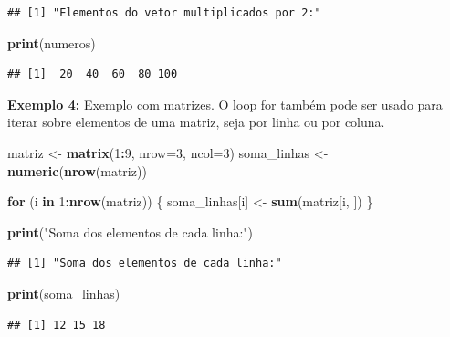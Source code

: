 \documentclass[
]{book}
\newenvironment{Shaded}{\begin{snugshade}}{\end{snugshade}}
\newcommand{\AttributeTok}[1]{\textcolor[rgb]{0.13,0.29,0.53}{#1}}
\newcommand{\ControlFlowTok}[1]{\textcolor[rgb]{0.13,0.29,0.53}{\textbf{#1}}}
\newcommand{\DecValTok}[1]{\textcolor[rgb]{0.00,0.00,0.81}{#1}}
\newcommand{\FunctionTok}[1]{\textcolor[rgb]{0.13,0.29,0.53}{\textbf{#1}}}
\newcommand{\NormalTok}[1]{#1}
\newcommand{\OtherTok}[1]{\textcolor[rgb]{0.56,0.35,0.01}{#1}}
\newcommand{\SpecialCharTok}[1]{\textcolor[rgb]{0.81,0.36,0.00}{\textbf{#1}}}
\newcommand{\StringTok}[1]{\textcolor[rgb]{0.31,0.60,0.02}{#1}}
\theoremstyle{definition}
\theoremstyle{definition}
\theoremstyle{definition}
\theoremstyle{definition}
\theoremstyle{remark}
\begin{document}
\begin{verbatim}
## [1] "Elementos do vetor multiplicados por 2:"
\end{verbatim}

\begin{Shaded}
\begin{Highlighting}[]
\FunctionTok{print}\NormalTok{(numeros)}
\end{Highlighting}
\end{Shaded}

\begin{verbatim}
## [1]  20  40  60  80 100
\end{verbatim}

\textbf{Exemplo 4:} Exemplo com matrizes. O loop for também pode ser usado para iterar sobre elementos de uma matriz, seja por linha ou por coluna.

\begin{Shaded}
\begin{Highlighting}[]
\NormalTok{matriz }\OtherTok{\textless{}{-}} \FunctionTok{matrix}\NormalTok{(}\DecValTok{1}\SpecialCharTok{:}\DecValTok{9}\NormalTok{, }\AttributeTok{nrow=}\DecValTok{3}\NormalTok{, }\AttributeTok{ncol=}\DecValTok{3}\NormalTok{)}
\NormalTok{soma\_linhas }\OtherTok{\textless{}{-}} \FunctionTok{numeric}\NormalTok{(}\FunctionTok{nrow}\NormalTok{(matriz))}

\ControlFlowTok{for}\NormalTok{ (i }\ControlFlowTok{in} \DecValTok{1}\SpecialCharTok{:}\FunctionTok{nrow}\NormalTok{(matriz)) \{}
\NormalTok{  soma\_linhas[i] }\OtherTok{\textless{}{-}} \FunctionTok{sum}\NormalTok{(matriz[i, ])}
\NormalTok{\}}

\FunctionTok{print}\NormalTok{(}\StringTok{"Soma dos elementos de cada linha:"}\NormalTok{)}
\end{Highlighting}
\end{Shaded}

\begin{verbatim}
## [1] "Soma dos elementos de cada linha:"
\end{verbatim}

\begin{Shaded}
\begin{Highlighting}[]
\FunctionTok{print}\NormalTok{(soma\_linhas)}
\end{Highlighting}
\end{Shaded}

\begin{verbatim}
## [1] 12 15 18
\end{verbatim}
\end{document}
